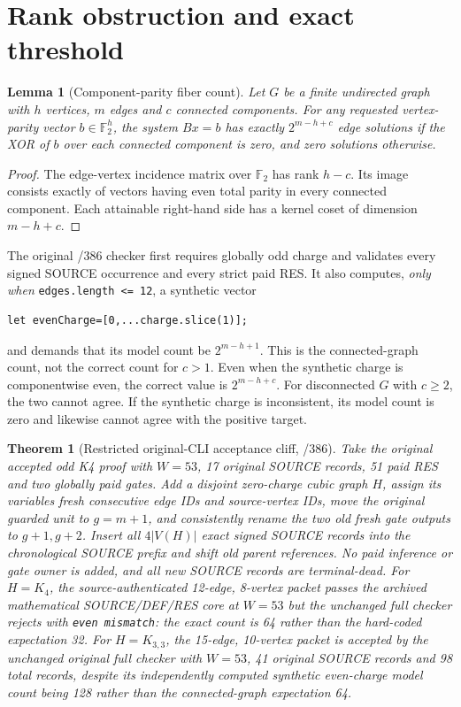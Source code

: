 \documentclass[11pt]{article}
\newtheorem{theorem}{Theorem}
\newtheorem{lemma}{Lemma}
\begin{document}
\section{Rank obstruction and exact threshold}
\begin{lemma}[Component-parity fiber count]
Let $G$ be a finite undirected graph with $h$ vertices, $m$ edges and $c$ connected components. For any requested vertex-parity vector $b\in\mathbb F_2^h$, the system $Bx=b$ has exactly $2^{m-h+c}$ edge solutions if the XOR of $b$ over each connected component is zero, and zero solutions otherwise.
\end{lemma}
\begin{proof}
The edge-vertex incidence matrix over $\mathbb F_2$ has rank $h-c$. Its image consists exactly of vectors having even total parity in every connected component. Each attainable right-hand side has a kernel coset of dimension $m-h+c$.
\end{proof}
The original /386 checker first requires globally odd charge and validates every signed SOURCE occurrence and every strict paid RES. It also computes, \emph{only when} \texttt{edges.length <= 12}, a synthetic vector
\begin{verbatim}
let evenCharge=[0,...charge.slice(1)];
\end{verbatim}
and demands that its model count be $2^{m-h+1}$. This is the connected-graph count, not the correct count for $c>1$. Even when the synthetic charge is componentwise even, the correct value is $2^{m-h+c}$. For disconnected $G$ with $c\ge2$, the two cannot agree. If the synthetic charge is inconsistent, its model count is zero and likewise cannot agree with the positive target.
\begin{theorem}[Restricted original-CLI acceptance cliff, /386]
Take the original accepted odd K4 proof with $W=53$, 17 original SOURCE records, 51 paid RES and two globally paid gates. Add a disjoint zero-charge cubic graph $H$, assign its variables fresh consecutive edge IDs and source-vertex IDs, move the original guarded unit to $g=m+1$, and consistently rename the two old fresh gate outputs to $g+1,g+2$. Insert all $4|V(H)|$ exact signed SOURCE records into the chronological SOURCE prefix and shift old parent references. No paid inference or gate owner is added, and all new SOURCE records are terminal-dead.
For $H=K_4$, the source-authenticated 12-edge, 8-vertex packet passes the archived mathematical SOURCE/DEF/RES core at $W=53$ but the unchanged full checker rejects with \texttt{even mismatch}: the exact count is 64 rather than the hard-coded expectation 32.
For $H=K_{3,3}$, the 15-edge, 10-vertex packet is accepted by the unchanged original full checker with $W=53$, 41 original SOURCE records and 98 total records, despite its independently computed synthetic even-charge model count being 128 rather than the connected-graph expectation 64.
\end{theorem}
\end{document}
